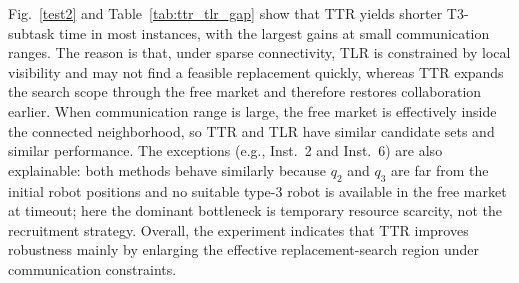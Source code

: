\documentclass[lettersize,journal]{IEEEtran}
\begin{document}
Fig.~\ref{test2} and Table~\ref{tab:ttr_tlr_gap} show that TTR yields shorter T3-subtask time in most instances, with the largest gains at small communication ranges. The reason is that, under sparse connectivity, TLR is constrained by local visibility and may not find a feasible replacement quickly, whereas TTR expands the search scope through the free market and therefore restores collaboration earlier. When communication range is large, the free market is effectively inside the connected neighborhood, so TTR and TLR have similar candidate sets and similar performance. The exceptions (e.g., Inst.~2 and Inst.~6) are also explainable: both methods behave similarly because $q_2$ and $q_3$ are far from the initial robot positions and no suitable type-3 robot is available in the free market at timeout; here the dominant bottleneck is temporary resource scarcity, not the recruitment strategy. Overall, the experiment indicates that TTR improves robustness mainly by enlarging the effective replacement-search region under communication constraints.
\end{document}
